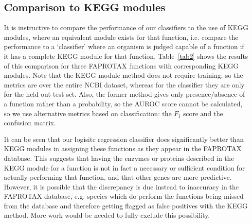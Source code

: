 \documentclass[10pt,letterpaper]{article}
\begin{document}
\subsection*{Comparison to KEGG modules}
It is instructive to compare the performance of our classifiers to the use of KEGG modules, where an equivalent module exists for that function, i.e. compare the performance to a `classifier' where an organism is judged capable of a function if it has a complete KEGG module for that function. Table~\ref{tab2} shows the results of this comparison for three FAPROTAX functions with corresponding KEGG modules. Note that the KEGG module method does not require training, so the metrics are over the entire NCBI dataset, whereas for the classifier they are only for the held-out test set. Also, the former method gives only presence/absence of a function rather than a probability, so the AUROC score cannot be calculated, so we use alternative metrics based on classification: the $F_1$ score and the confusion matrix.

It can be seen that our logisitc regression classifier does significantly better than KEGG modules in assigning these functions as they appear in the FAPROTAX database. This suggests that having the enzymes or proteins described in the KEGG module for a function is not in fact a necessary or sufficient condition for actually performing that function, and that other genes are more predictive. However, it is possible that the discrepancy is due instead to inaccuracy in the FAPROTAX database, e.g. species which do perform the functions being missed from the database and therefore getting flagged as false positives with the KEGG method. More work would be needed to fully exclude this possibility.  
\end{document}

